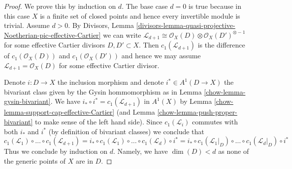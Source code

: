 \begin{proof}

We prove this by induction on $d$. The base case $d = 0$ is true because
in this case $X$ is a finite set of closed points and hence every invertible
module is trivial. Assume $d > 0$. By Divisors, Lemma
\ref{divisors-lemma-quasi-projective-Noetherian-pic-effective-Cartier}
we can write $\mathcal{L}_{d + 1} \cong \mathcal{O}_X(D) \otimes
\mathcal{O}_X(D')^{\otimes -1}$ for some effective Cartier divisors
$D, D' \subset X$. Then $c_1(\mathcal{L}_{d + 1})$ is the difference
of $c_1(\mathcal{O}_X(D))$ and $c_1(\mathcal{O}_X(D'))$ and hence
we may assume $\mathcal{L}_{d + 1} = \mathcal{O}_X(D)$ for some
effective Cartier divisor.

\medskip\noindent
Denote $i : D \to X$ the inclusion morphism and denote
$i^* \in A^1(D \to X)$ the bivariant class given by the
Gysin hommomorphism as in Lemma \ref{chow-lemma-gysin-bivariant}.
We have $i_* \circ i^* = c_1(\mathcal{L}_{d + 1})$
in $A^1(X)$ by Lemma \ref{chow-lemma-support-cap-effective-Cartier}
(and Lemma \ref{chow-lemma-push-proper-bivariant}
to make sense of the left hand side).
Since $c_1(\mathcal{L}_i)$ commutes with
both $i_*$ and $i^*$ (by definition of bivariant classes)
we conclude that
$$
c_1(\mathcal{L}_1) \circ \ldots \circ c_1(\mathcal{L}_{d + 1}) =
i_* \circ c_1(\mathcal{L}_1) \circ \ldots \circ c_1(\mathcal{L}_d) \circ i^* =
i_* \circ c_1(\mathcal{L}_1|_D) \circ \ldots \circ c_1(\mathcal{L}_d|_D)
\circ i^*
$$
Thus we conclude by induction on $d$. Namely, we have $\dim(D) < d$
as none of the generic points of $X$ are in $D$.
\end{proof}

